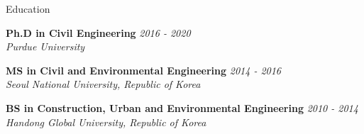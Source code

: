 \documentclass{resume_anzy} %
\begin{document}

%


\begin{rSection}{Education}

{\bf Ph.D in Civil Engineering} \hfill {\em 2016 - 2020} \\ 
\textit{Purdue University}  

{\bf MS in Civil and Environmental Engineering } \hfill {\em 2014 - 2016} \\ 
\textit{Seoul National University, Republic of Korea}

{\bf BS in Construction, Urban and Environmental Engineering} \hfill {\em 2010 - 2014} \\ 
\textit{Handong Global University, Republic of Korea}

\end{rSection}


%
%
%
\end{document}
